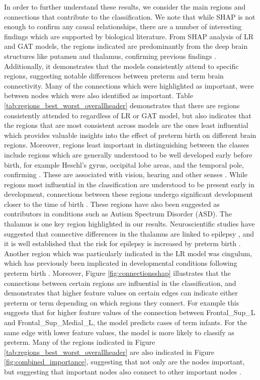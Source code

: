 \documentclass[doubleblind]{ecai}
\begin{document}
In order to further understand these results, we consider the main regions and connections that contribute to the classification. We note that while SHAP is not enough to confirm any causal relationships, there are a number of interesting findings which are supported by biological literature.
From SHAP analysis of LR and GAT models, the regions indicated are predominantly from the deep brain structures like putamen and thalamus, confirming previous findings \cite{gilmore2018imaging,rea2015essential}. Additionally, it demonstrates that the models consistently attend to specific regions, suggesting notable differences between preterm and term brain connectivity. Many of the connections which were highlighted as important, were between nodes which were also identified as important. Table \ref{tab:regions_best_worst_overallheader} demonstrates that there are regions consistently attended to regardless of LR or GAT model, but also indicates that the regions that are most consistent across models are the ones least influential which provides valuable insights into the effect of preterm birth on different brain regions.
Moreover, regions least important in distinguishing between the classes include regions which are generally understood to be well developed early before birth, for example Heschl’s gyrus, occipital lobe areas, and the temporal pole, confirming \citet{gilmore2018imaging}. These are associated with vision, hearing and other senses \cite{rea2015essential}. While regions most influential in the classification are understood to be present early in development, connections between these regions undergo significant development closer to the time of birth \cite{taymourtash2023fetal}. These regions have also been suggested as contributors in conditions such as Autism Spectrum Disorder (ASD)\cite{schuetze2016morphological}. The thalamus is one key region highlighted in our results. Neuroscientific studies have suggested that connective differences in the thalamus are linked to epilepsy \cite{marcuse2025thalamus}, and it is well established that the risk for epilepsy is increased by preterm birth \cite{ream2018neurologic,ball2012effect}. Another region which was particularly indicated in the LR model was cingulum, which has previously been implicated in developmental conditions following preterm birth \cite{lee2021cingulum}. Moreover, Figure \ref{fig:connectionsshap} illustrates that the connections between certain regions are influential in the classification, and demonstrates that higher feature values on certain edges can indicate either preterm or term depending on which regions they connect. For example this suggests that for higher feature values of the connection between Frontal\_Sup\_L and Frontal\_Sup\_Medial\_L, the model predicts cases of term infants. For the same edge with lower feature values, the model is more likely to classify as preterm. Many of the regions indicated in Figure \ref{tab:regions_best_worst_overallheader} are also indicated in Figure \ref{fig:combined_importance}, suggesting that not only are the nodes important, but suggesting that important nodes also connect to other important nodes \cite{bauer2017nonlinear,karolis2016reinforcement}.
\end{document}
